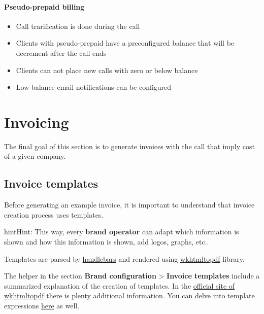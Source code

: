 \documentclass[letterpaper,10pt,english]{sphinxmanual}
\begin{document}
\paragraph{Pseudo-prepaid billing}
\label{brand/billing/bill_a_call:pseudo-prepaid-billing}\begin{itemize}
\item {} 
Call trarification is done during the call

\item {} 
Clients with pseudo-prepaid have a preconfigured balance that will be decrement after the call ends

\item {} 
Clients can not place new calls with zero or below balance

\item {} 
Low balance email notifications can be configured

\end{itemize}


\section{Invoicing}
\label{brand/invoices/index::doc}\label{brand/invoices/index:invoicing}
The final goal of this section is to generate invoices with the call that imply
cost of a given company.


\subsection{Invoice templates}
\label{brand/invoices/templates::doc}\label{brand/invoices/templates:invoice-templates}
Before generating an example invoice, it is important to understand that invoice
creation process uses templates.

\begin{notice}{hint}{Hint:}
This way, every \textbf{brand operator} can adapt which information
is shown and how this information is shown, add logos, graphs, etc..
\end{notice}

Templates are parsed by \href{https://github.com/XaminProject/handlebars.php}{handlebars} and rendered
using \href{https://wkhtmltopdf.org/}{wkhtmltopdf} library.

The helper in the section \textbf{Brand configuration} \textgreater{} \textbf{Invoice templates} include
a summarized explanation of the creation of templates. In the \href{https://wkhtmltopdf.org/usage/wkhtmltopdf.txt}{official site of wkhtmltopdf} there is plenty additional information.
You can delve into template expressions \href{http://handlebarsjs.com/expressions.html}{here} as well.
\end{document}
